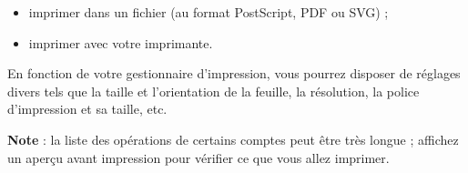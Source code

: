 \begin{itemize}
	\item imprimer dans un fichier (au format \gls{PostScript}, \gls{PDF} ou \gls{SVG}) ;
	\item imprimer avec votre imprimante.
\end{itemize}

En fonction de votre gestionnaire d'impression, vous pourrez disposer de réglages divers tels que la taille et l'orientation de la feuille, la résolution, la police d'impression et sa taille, etc.

\textbf{Note} : la liste des opérations de certains comptes peut être très longue ; affichez un aperçu avant impression pour vérifier ce que vous allez imprimer.


%
%
%
%
%
